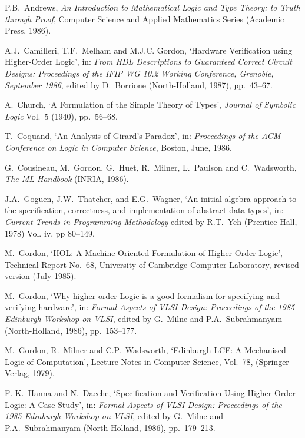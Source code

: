 \begin{thebibliography}{99}

P.B.\ Andrews,
{\it An Introduction to Mathematical Logic
     and Type Theory: to Truth through Proof},
Computer Science and Applied Mathematics Series
(Academic Press, 1986).

A.J.\ Camilleri, T.F.\ Melham and M.J.C. Gordon,
`Hardware Verification using Higher-Order Logic',
in: {\it From HDL Descriptions to Guaranteed Correct \mbox{Circuit}
Designs: Proceedings of the IFIP WG 10.2 Working Conference, Grenoble,
September 1986}, edited by D.\ Borrione (North-Holland, 1987), pp.\ 43--67.

A.\ Church,
`A Formulation of the Simple Theory of Types',
{\it Journal of Symbolic Logic} Vol.\ 5 (1940), pp.\ 56--68.

T.\ Coquand, `An Analysis of Girard's Paradox',
in: {\it Proceedings of the ACM Conference on
Logic in Computer Science\/}, Boston, June, 1986.

G.\ Cousineau, M.\ Gordon, G.\ Huet, R.\ Milner,
L.\ Paulson and C.\ Wadsworth,
{\it The ML Handbook} ({\small INRIA}, 1986).

J.A.\ Goguen, J.W.\ Thatcher, and E.G.\ Wagner,
`An initial algebra \mbox{approach} to the specification,
correctness, and implementation of abstract data types',
in: {\it Current Trends in Programming Methodology\/}
edited by R.T.\ Yeh (Prentice-Hall, 1978)
Vol. {\sc iv}, pp 80--149.

M.\ Gordon,
`HOL: A Machine Oriented Formulation of Higher-Order Logic',
Technical Report No.\ 68,
University of Cambridge Computer Laboratory, revised version
(July 1985).

M.\ Gordon,
`Why higher-order Logic
is a good formalism for specifying and verifying hardware',
in: {\it Formal Aspects of VLSI Design: Proceedings of the 1985 Edinburgh
      Workshop on VLSI\/}, edited by G.\ Milne and
P.A.\ Subrahmanyam (North-Holland, 1986), pp.\ 153--177.

M.\ Gordon, R.\ Milner and C.P.\ Wadsworth,
`Edinburgh LCF: A Mechanised Logic of Computation',
Lecture Notes in Computer Science, Vol.\ 78,
(Springer-Verlag, 1979).

F. K.\ Hanna and N.\ Daeche,
`Specification and Verification Using Higher-Order Logic: A Case Study',
in: {\it Formal Aspects of VLSI Design: Proceedings of the 1985 Edinburgh
      Workshop on VLSI\/}, edited by G.\ Milne and
P.A.\ Subrahmanyam (North-Holland, 1986), pp.\ 179--213.


\end{thebibliography}
